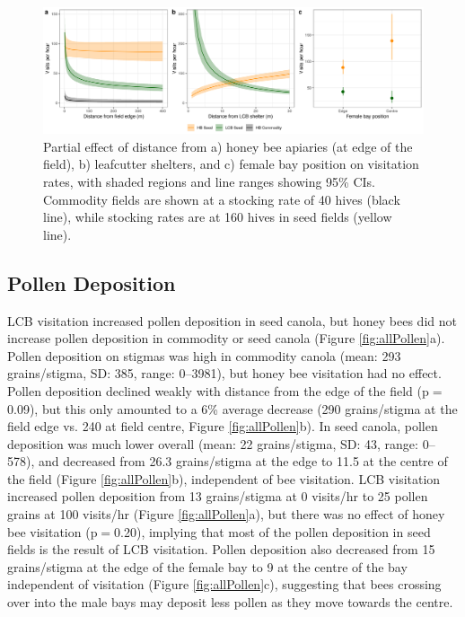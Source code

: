 \documentclass[12pt]{article} %
\begin{document}
\begin{figure}
    \centering
    \includegraphics[width=\textwidth,keepaspectratio=true]{../Figures/allVisits.png}
    \caption{Partial effect of distance from a) honey bee apiaries (at edge of the field), b) leafcutter shelters, and c) female bay position on visitation rates, with shaded regions and line ranges showing 95\% CIs. Commodity fields are shown at a stocking rate of 40 hives (black line), while stocking rates are at 160 hives in seed fields (yellow line).}
    \label{fig:allVisits}
\end{figure}

\subsection*{Pollen Deposition}

LCB visitation increased pollen deposition in seed canola, but honey bees did not increase pollen deposition in commodity or seed canola (Figure \ref{fig:allPollen}a).
Pollen deposition on stigmas was high in commodity canola (mean: 293 grains/stigma, SD: 385, range: 0--3981), but honey bee visitation had no effect.
Pollen deposition declined weakly with distance from the edge of the field (p$=$0.09), but this only amounted to a 6\% average decrease (290 grains/stigma at the field edge vs. 240 at field centre, Figure \ref{fig:allPollen}b).
In seed canola, pollen deposition was much lower overall (mean: 22 grains/stigma, SD: 43, range: 0--578), and decreased from 26.3 grains/stigma at the edge to 11.5 at the centre of the field (Figure \ref{fig:allPollen}b), independent of bee visitation.
LCB visitation increased pollen deposition from 13 grains/stigma at 0 visits/hr to 25 pollen grains at 100 visits/hr (Figure \ref{fig:allPollen}a), but there was no effect of honey bee visitation (p$=$0.20), implying that most of the pollen deposition in seed fields is the result of LCB visitation.
Pollen deposition also decreased from 15 grains/stigma at the edge of the female bay to 9 at the centre of the bay independent of visitation (Figure \ref{fig:allPollen}c), suggesting that bees crossing over into the male bays may deposit less pollen as they move towards the centre.%
\end{document}
